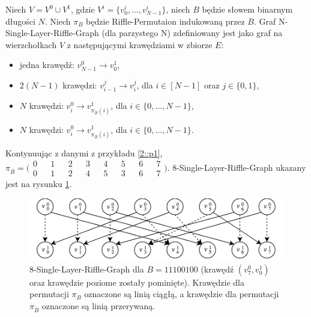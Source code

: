 \begin{definition} Niech $V = V^{0} \cup V^{1}$, gdzie $V^{i} = \{ v_{0}^{i},\dots,v_{N-1}^{i} \}$, niech $B$ będzie słowem binarnym długości $N$. Niech $\pi_{B}$ będzie Riffle-Permutaion indukowaną przez $B$.
	Graf N-Single-Layer-Riffle-Graph (dla parzystego N) zdefiniowany jest jako graf na wierzchołkach $V$ z następującymi krawędziami w zbiorze $E$:
	\begin{itemize}
		\item jedna krawędź: $v_{N-1}^{0} \rightarrow v_{0}^{1}$,
		
		\item $2(N - 1)$ krawędzi: $v_{i-1}^{j} \rightarrow v_{i}^{j}$, dla $i \in [N-1]$ oraz $j \in \{0, 1\}$,
		
		\item $N$ krawędzi: $v_{i}^{0} \rightarrow v_{\pi_{B}(i)}^{1}$, dla $i \in \{0,\dots,N -1\}$,
		
		\item $N$ krawędzi: $v_{i}^{0} \rightarrow v_{\pi_{\overline{B}}(i)}^{1}$, dla $i \in \{0,\dots,N -1\}$.
	\end{itemize}
\end{definition}

\begin{example}
	Kontynuując z danymi z przykładu \ref{2::p1},
		$\pi_{\overline{B}} = \bigl( \begin{smallmatrix}
	0 && 1 && 2 && 3 && 4 && 5 && 6 && 7 \\
	0 && 1 && 2 && 4 && 5 && 3 && 6 && 7
	\end{smallmatrix} \bigr) $.
	 8-Single-Layer-Riffle-Graph ukazany jest na rysunku \ref{2::im2}.
\end{example}

\begin{figure}[h]
	\includegraphics[width=\textwidth]{rp2.png}
	\centering
	\caption{8-Single-Layer-Riffle-Graph dla $B=11100100$ (krawędź $(v_{7}^{0}, v_{0}^{1})$ oraz krawędzie poziome zostały pominięte). Krawędzie dla permutacji $\pi_{B}$ oznaczone są linią ciągłą, a krawędzie dla permutacji $\pi_{\overline{B}}$ oznaczone są linią przerywaną.}
	\label{2::im2}
\end{figure}

